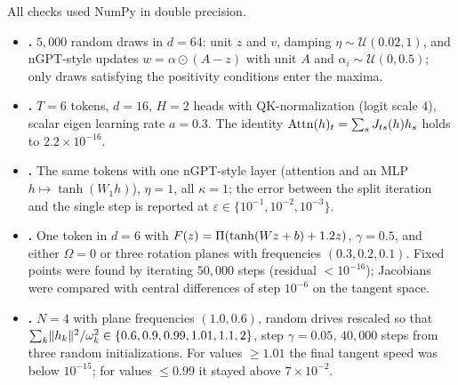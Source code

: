 All checks used NumPy in double precision. %
\begin{itemize}
  \item \textbf{.} $5{,}000$ random draws in $d=64$: unit $z$ and $v$, damping
  $\eta\sim\mathcal U(0.02,1)$, and nGPT-style updates $w=\alpha\odot(A-z)$ with unit $A$ and
  $\alpha_i\sim\mathcal U(0,0.5)$; only draws satisfying the positivity conditions enter the maxima.
  \item \textbf{.} $T=6$ tokens, $d=16$, $H=2$ heads with QK-normalization
  (logit scale $4$), scalar eigen learning rate $a=0.3$. The identity
  $\operatorname{Attn}(h)_t=\sum_sJ_{ts}(h)h_s$ holds to $2.2\times10^{-16}$.
  \item \textbf{.} The same tokens with one nGPT-style layer (attention and an MLP
  $h\mapsto\tanh(W_1h)$), $\eta=1$, all $\kappa=1$; the error between the split iteration and the single
  step is reported at $\varepsilon\in\{10^{-1},10^{-2},10^{-3}\}$.
  \item \textbf{.} One token in $d=6$ with
  $F(z)=\Pi(\tanh(Wz+b)+1.2z)$, $\gamma=0.5$, and either $\Omega=0$ or three rotation planes with
  frequencies $(0.3,0.2,0.1)$. Fixed points were found by iterating $50{,}000$ steps (residual
  $<10^{-16}$); Jacobians were compared with central differences of step $10^{-6}$ on the tangent space.
  \item \textbf{.} $N=4$ with plane frequencies $(1.0,0.6)$, random drives rescaled so
  that $\sum_k\lVert h_k\rVert^2/\omega_k^2\in\{0.6,0.9,0.99,1.01,1.1,2\}$, step $\gamma=0.05$, $40{,}000$ steps
  from three random initializations. For values $\ge1.01$ the final tangent speed was below
  $10^{-15}$; for values $\le0.99$ it stayed above $7\times10^{-2}$.
\end{itemize}
